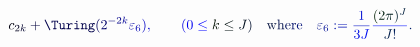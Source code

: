 \documentclass[12pt]{article}
\begin{document}
\makeatletter
\renewcommand*{\@textcolor}[3]{%
  \protect\leavevmode
  \begingroup
    \color#1{#2}#3%
  \endgroup
}
\makeatother
\begin{displaymath}
\mathcolor[RGB]{0,0,15}{c} _ { \mathcolor[RGB]{0,0,30}{2} \mathcolor[RGB]{0,0,45}{k} } \mathcolor[RGB]{0,0,60}{+} \mathcolor[RGB]{0,0,75}{\Turing} \mathcolor[RGB]{0,0,90}{(} \mathcolor[RGB]{0,0,105}{2} ^ { \mathcolor[RGB]{0,0,120}{-} \mathcolor[RGB]{0,0,135}{2} \mathcolor[RGB]{0,0,150}{k} } \mathcolor[RGB]{0,0,165}{\varepsilon} _ { \mathcolor[RGB]{0,0,180}{6} } \mathcolor[RGB]{0,0,195}{)} \mathcolor[RGB]{0,0,210}{,} \qquad \mathcolor[RGB]{0,0,225}{(} \mathcolor[RGB]{0,0,240}{0} \mathcolor[RGB]{0,0,255}{\le} \mathcolor[RGB]{0,15,0}{k} \mathcolor[RGB]{0,15,15}{\le} \mathcolor[RGB]{0,15,30}{J} \mathcolor[RGB]{0,15,45}{)} \quad \mathrm { \mathcolor[RGB]{0,15,60}{w} \mathcolor[RGB]{0,15,75}{h} \mathcolor[RGB]{0,15,90}{e} \mathcolor[RGB]{0,15,105}{r} \mathcolor[RGB]{0,15,120}{e} } \quad \mathcolor[RGB]{0,15,135}{\varepsilon} _ { \mathcolor[RGB]{0,15,150}{6} } \mathcolor[RGB]{0,15,165}{:} \mathcolor[RGB]{0,15,180}{=} \mathcolor[RGB]{0,15,195}{\frac { \mathcolor[RGB]{0,15,210}{1} } { \mathcolor[RGB]{0,15,225}{3} \mathcolor[RGB]{0,15,240}{J} } } \mathcolor[RGB]{0,15,255}{\frac { \mathcolor[RGB]{0,30,0}{(} \mathcolor[RGB]{0,30,15}{2} \mathcolor[RGB]{0,30,30}{\pi} \mathcolor[RGB]{0,30,45}{)} ^ { \mathcolor[RGB]{0,30,60}{J} } } { \mathcolor[RGB]{0,30,75}{J} \mathcolor[RGB]{0,30,90}{!} } } \mathcolor[RGB]{0,30,105}{.}
\end{displaymath}
\end{document}
